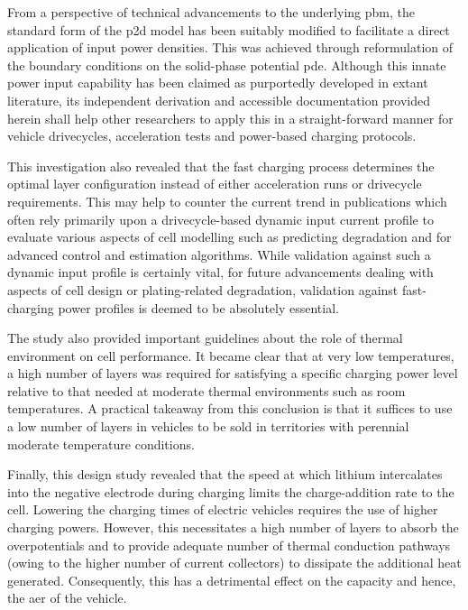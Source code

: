 From a  perspective of technical  advancements to the underlying  \gls{pbm}, the
standard form  of the \gls{p2d} model  has been suitably modified  to facilitate
a  direct  application of  input  power  densities.  This was  achieved  through
reformulation of the boundary conditions on the solid-phase potential \gls{pde}.
Although  this innate  power input  capability has  been claimed  as purportedly
developed  in  extant  literature,  its independent  derivation  and  accessible
documentation  provided herein  shall help  other researchers  to apply  this in
a  straight-forward  manner  for  vehicle drivecycles,  acceleration  tests  and
power-based charging protocols.

This investigation also  revealed that the fast charging  process determines the
optimal layer  configuration instead of  either acceleration runs  or drivecycle
requirements. This may  help to counter the current trend  in publications which
often rely  primarily upon a  drivecycle-based dynamic input current  profile to
evaluate various  aspects of cell  modelling such as predicting  degradation and
for advanced control and estimation  algorithms. While validation against such a
dynamic input profile  is certainly vital, for future  advancements dealing with
aspects  of  cell  design  or plating-related  degradation,  validation  against
fast-charging power profiles is deemed to be absolutely essential.

The  study  also  provided  important  guidelines  about  the  role  of  thermal
environment on cell performance. It became  clear that at very low temperatures,
a high  number of layers was  required for satisfying a  specific charging power
level relative  to that  needed at  moderate thermal  environments such  as room
temperatures. A practical  takeaway from this conclusion is that  it suffices to
use a low number of layers in  vehicles to be sold in territories with perennial
moderate temperature conditions.

Finally, this design study revealed that the speed at which lithium intercalates
into the negative  electrode during charging limits the  charge-addition rate to
the cell. Lowering  the charging times of electric vehicles  requires the use of
higher charging  powers. However, this necessitates  a high number of  layers to
absorb the overpotentials  and to provide adequate number  of thermal conduction
pathways (owing  to the higher  number of  current collectors) to  dissipate the
additional heat  generated. Consequently, this  has a detrimental effect  on the
capacity and hence, the \gls{aer} of the vehicle.

